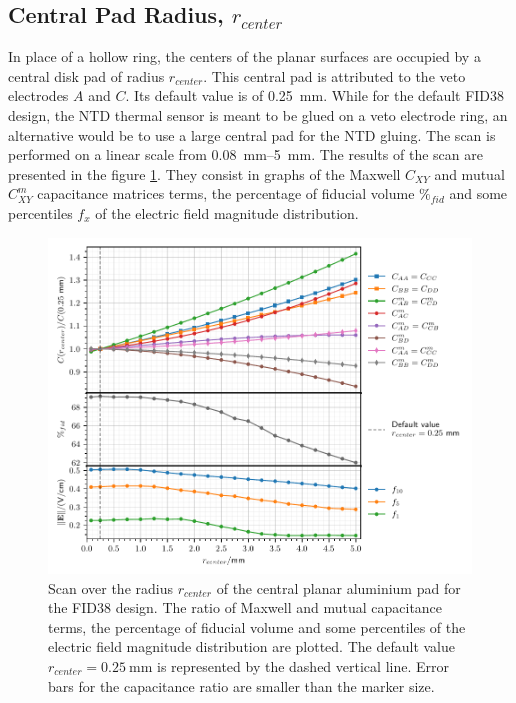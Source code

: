 \subsection{Central Pad Radius, $r_{center}$}

In place of a hollow ring, the centers of the planar surfaces are occupied by a central disk pad of radius $r_{center}$. This central pad is attributed to the veto electrodes $A$ and $C$. Its default value is of \SI{0.25}{\mm}. While for the default FID38 design, the NTD thermal sensor is meant to be glued on a veto electrode ring, an alternative would be to use a large central pad for the NTD gluing. The scan is performed on a linear scale from \SIrange{0.08}{5}{\mm}. The results of the scan are presented in the figure \ref{fig:capacitance-fiducial-r-center}. They consist in graphs of the Maxwell $C_{XY}$ and mutual $C_{XY}^m$ capacitance matrices terms, the percentage of fiducial volume $\%_{fid}$ and some percentiles $f_x$ of the electric field magnitude distribution.

\begin{figure}
\centering
\includegraphics[scale=1]{Figures/ElectrodesScan/capacitance_fiducial_r_center.pdf}
\caption{Scan over the radius $r_{center}$ of the central planar aluminium pad for the FID38 design. The ratio of Maxwell and mutual capacitance terms, the percentage of fiducial volume and some percentiles of the electric field magnitude distribution are plotted. The default value $r_{center}=\SI{0.25}{\mm}$ is represented by the dashed vertical line. Error bars for the capacitance ratio are smaller than the marker size.}
\label{fig:capacitance-fiducial-r-center}
\end{figure}

